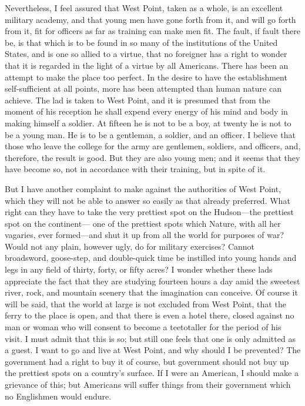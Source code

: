 Nevertheless, I feel assured that West Point, taken as a whole, is
an excellent military academy, and that young men have gone forth
from it, and will go forth from it, fit for officers as far as
training can make men fit.  The fault, if fault there be, is that
which is to be found in so many of the institutions of the United
States, and is one so allied to a virtue, that no foreigner has a
right to wonder that it is regarded in the light of a virtue by all
Americans.  There has been an attempt to make the place too
perfect.  In the desire to have the establishment self-sufficient
at all points, more has been attempted than human nature can
achieve.  The lad is taken to West Point, and it is presumed that
from the moment of his reception he shall expend every energy of
his mind and body in making himself a soldier.  At fifteen he is
not to be a boy, at twenty he is not to be a young man.  He is to
be a gentleman, a soldier, and an officer.  I believe that those
who leave the college for the army are gentlemen, soldiers, and
officers, and, therefore, the result is good.  But they are also
young men; and it seems that they have become so, not in accordance
with their training, but in spite of it.

But I have another complaint to make against the authorities of
West Point, which they will not be able to answer so easily as that
already preferred.  What right can they have to take the very
prettiest spot on the Hudson---the prettiest spot on the continent---%
one of the prettiest spots which Nature, with all her vagaries,
ever formed---and shut it up from all the world for purposes of war?
Would not any plain, however ugly, do for military exercises?
Cannot broadsword, goose-step, and double-quick time be instilled
into young hands and legs in any field of thirty, forty, or fifty
acres?  I wonder whether these lads appreciate the fact that they
are studying fourteen hours a day amid the sweetest river, rock,
and mountain scenery that the imagination can conceive.  Of course
it will be said, that the world at large is not excluded from West
Point, that the ferry to the place is open, and that there is even
a hotel there, closed against no man or woman who will consent to
become a teetotaller for the period of his visit.  I must admit
that this is so; but still one feels that one is only admitted as a
guest.  I want to go and live at West Point, and why should I be
prevented?  The government had a right to buy it of course, but
government should not buy up the prettiest spots on a country's
surface.  If I were an American, I should make a grievance of this;
but Americans will suffer things from their government which no
Englishmen would endure.

